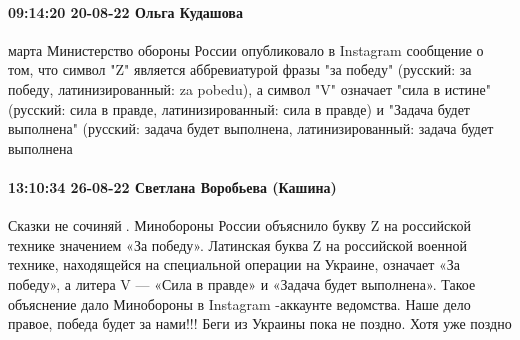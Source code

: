  
 
 
 
 

\paragraph{09:14:20 20-08-22 Ольга Кудашова}

марта Министерство обороны России опубликовало в Instagram сообщение о том, что
символ "Z" является аббревиатурой фразы "за победу" (русский: за победу,
латинизированный: za pobedu), а символ "V" означает "сила в истине" (русский:
сила в правде, латинизированный: сила в правде) и "Задача будет выполнена"
(русский: задача будет выполнена, латинизированный: задача будет выполнена

\paragraph{13:10:34 26-08-22 Светлана Воробьева (Кашина)}

Сказки не сочиняй🙂. Минобороны России объяснило букву Z на российской технике
значением «За победу». Латинская буква Z на российской военной технике,
находящейся на специальной операции на Украине, означает «За победу», а литера
V — «Сила в правде» и «Задача будет выполнена». Такое объяснение дало
Минобороны в Instagram -аккаунте ведомства. Наше дело правое, победа будет за
нами!!! Беги из Украины пока не поздно. Хотя уже поздно 🙂🙂


